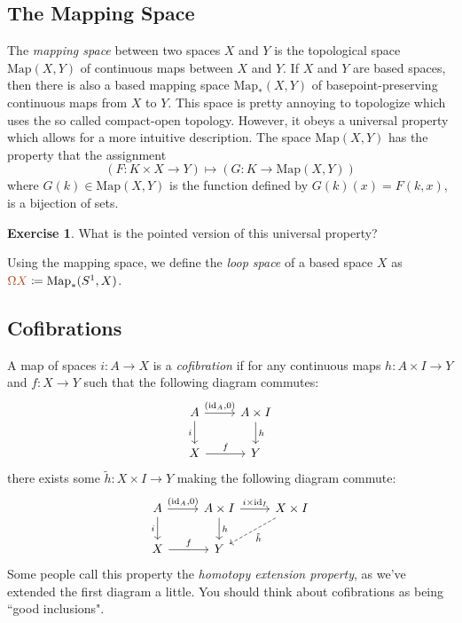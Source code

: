 \documentclass[10pt]{amsart}
\theoremstyle{definition}
\newtheorem{exercise}[thm]{Exercise}
\newcommand{\cdef}[1]{\textcolor{Bittersweet}{#1}}
\begin{document}
\subsection*{The Mapping Space}
The \emph{\cdef{mapping space}} between two spaces $X$ and $Y$ is the topological space $\text{Map}(X, Y)$ of continuous maps between $X$ and $Y$. If $X$ and $Y$ are based spaces, then there is also a based mapping space $\text{Map}_*(X, Y)$ of basepoint-preserving continuous maps from $X$ to $Y$. This space is pretty annoying to topologize which uses the so called compact-open topology. However, it obeys a universal property which allows for a more intuitive description. The space $\text{Map}(X, Y)$ has the property that the assignment
\[\left(F:K \times X \to Y\right) \mapsto \left(G:K \to \text{Map}(X, Y)\right)\]
where $G(k) \in \text{Map}(X, Y)$ is the function defined by $G(k)(x) = F(k, x)$, is a bijection of sets.

\begin{exercise}
    What is the pointed version of this universal property?
\end{exercise}

Using the mapping space, we define the \emph{\cdef{loop space}} of a based space $X$ as $\cdef{\Omega X} \coloneq \text{Map}_*(S^1, X)$.

\subsection{Cofibrations}
A map of spaces $i:A \to X$ is a \cdef{\emph{cofibration}} if for any continuous maps $h:A \times I \to Y$ and $f:X \to Y$ such that the following diagram commutes:
\[
\begin{tikzcd}
	A & {A \times I} \\
	X & Y
	\arrow["{(\text{id}_A, 0)}", from=1-1, to=1-2]
	\arrow["i"', from=1-1, to=2-1]
	\arrow["h", from=1-2, to=2-2]
	\arrow["f", from=2-1, to=2-2]
\end{tikzcd}
\]
there exists some $\tilde{h}:X \times I \to Y$ making the following diagram commute:
\[
\begin{tikzcd}
	A & {A \times I} & {X \times I} \\
	X & Y
	\arrow["{(\text{id}_A, 0)}", from=1-1, to=1-2]
	\arrow["i"', from=1-1, to=2-1]
	\arrow["{i \times \text{id}_I}", from=1-2, to=1-3]
	\arrow["h", from=1-2, to=2-2]
	\arrow["{\tilde{h}}", dashed, from=1-3, to=2-2]
	\arrow["f", from=2-1, to=2-2]
\end{tikzcd}
\]
Some people call this property the \cdef{\emph{homotopy extension property}}, as we've extended the first diagram a little. 
You should think about cofibrations as being ``good inclusions".
\end{document}

